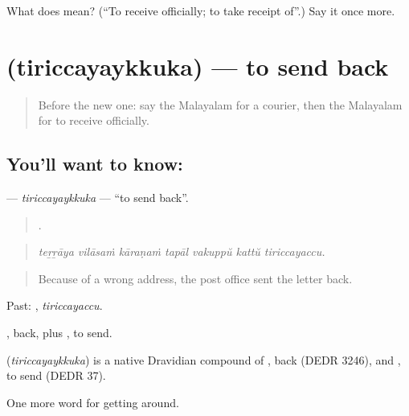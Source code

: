 \begin{tcolorbox}[breakable,colback=teal!4,colframe=teal!35!black,title={Before you move on}]
What does  mean? (\textquotedblleft{}To receive officially; to take receipt of\textquotedblright{}.) Say it once more.
\end{tcolorbox}
\section[\texorpdfstring{\ml{തിരിച്ചയയ്ക്കുക} (tiriccayaykkuka)}{തിരിച്ചയയ്ക്കുക (tiriccayaykkuka)}]{ (tiriccayaykkuka) — to send back}

\label{lesson:ML-C490-tiriccayaykkuka}



\begin{quote}
Before the new one: say the Malayalam for a courier, then the Malayalam for to receive officially.
\end{quote}

\subsection*{You'll want to know: }
\textbf{} — \emph{tiriccayaykkuka} — \textquotedblleft{}to send back\textquotedblright{}.

\begin{quote}
      .
\end{quote}

\begin{quote}
\emph{teṟṟāya vilāsaṁ kāraṇaṁ tapāl vakuppŭ kattŭ tiriccayaccu.}
\end{quote}

\begin{quote}
Because of a wrong address, the post office sent the letter back.
\end{quote}

Past: , \emph{tiriccayaccu}.

, back, plus , to send.

\begin{cousinweb}
\textbf{} (\emph{tiriccayaykkuka}) is a native Dravidian compound of , back (DEDR 3246), and , to send (DEDR 37).
\end{cousinweb}

\begin{grammarlens}[title={What you've built}]
One more word for getting around.
\end{grammarlens}

